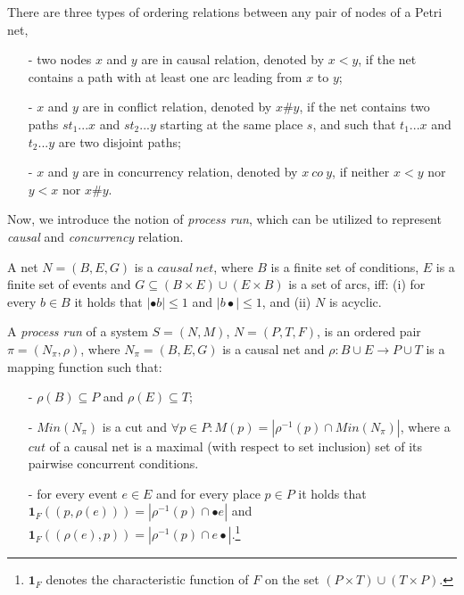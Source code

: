 \documentclass{llncs}
\begin{document}
\begin{definition}\label{def:orderingRelations}
There are three types of ordering relations between any pair of nodes of a Petri net,
	\begin{itemize}
		\item[-] two nodes $x$ and $y$ are in causal relation, denoted by $x<y$, if the net contains a path with at least one arc leading from $x$ to $y$;
		\item[-] $x$ and $y$ are in conflict relation, denoted by $x\#y$, if the net contains two paths $st_{1}...x$ and $st_{2}...y$ starting at the same place $s$, and such that $t_{1}...x$ and $t_{2}...y$ are two disjoint paths;
		\item[-] $x$ and $y$ are in concurrency relation, denoted by $x~co~y$, if neither $x<y$ nor $y<x$ nor $x\#y$.
	\end{itemize}
\end{definition}

Now, we introduce the notion of \textit{process run}, which can be utilized to represent \textit{causal} and \textit{concurrency} relation.

\begin{definition}\label{def:causalNet}
A net $N=(B,E,G)$ is a $causal~net$, where $B$ is a finite set of conditions, $E$ is a finite set of events and $G\subseteq(B\times E)\cup(E\times B)$ is a set of arcs, iff: (i) for every $b\in B$ it holds that $|\bullet b|\leq 1$ and $|b\bullet|\leq 1$, and (ii) $N$ is acyclic.
\end{definition}

\begin{definition}\label{def:run}
A \textit{process run} of a system $S=(N,M)$, $N=(P,T,F)$, is an ordered pair $\pi=(N_{\pi},\rho)$, where $N_{\pi}=(B,E,G)$ is a causal net and $\rho:B\cup E\rightarrow P\cup T$ is a mapping function such that:
	\begin{itemize}
		\item[-] $\rho(B)\subseteq P$ and $\rho(E)\subseteq T$;
		\item[-] $Min(N_{\pi})$ is a cut and $\forall p\in P:M(p)=|\rho^{-1}(p)\cap Min(N_{\pi})|$, where a $cut$ of a causal net is a maximal (with respect to set inclusion) set of its pairwise concurrent conditions.
		\item[-] for every event $e\in E$ and for every place $p\in P$ it holds that $\bm{1}_{F}((p,\rho(e)))=|\rho^{-1}(p)\cap\bullet e|$ and $\bm{1}_{F}((\rho(e),p))=|\rho^{-1}(p)\cap e\bullet|$.\footnote{$\bm{1}_{F}$ denotes the characteristic function of $F$ on the set $(P\times T)\cup(T\times P)$.}
	\end{itemize}
\end{definition}
\end{document}
